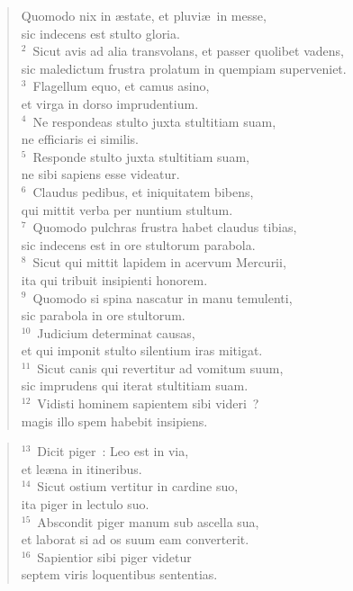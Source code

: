 \begin{flushleft}\begin{verse}\vspace{-19pt}\hspace{6pt}Quomodo nix in \ae state, et pluvi\ae\ in messe,\\\hspace{6pt} sic indecens est stulto gloria.\\
${}^{2}$~Sicut avis ad alia transvolans, et passer quolibet vadens,\\ sic maledictum frustra prolatum in quempiam superveniet.\\
${}^{3}$~Flagellum equo, et camus asino,\\ et virga in dorso imprudentium.\\
${}^{4}$~Ne respondeas stulto juxta stultitiam suam,\\ ne efficiaris ei similis.\\
${}^{5}$~Responde stulto juxta stultitiam suam,\\ ne sibi sapiens esse videatur.\\
${}^{6}$~Claudus pedibus, et iniquitatem bibens,\\ qui mittit verba per nuntium stultum.\\
${}^{7}$~Quomodo pulchras frustra habet claudus tibias,\\ sic indecens est in ore stultorum parabola.\\
${}^{8}$~Sicut qui mittit lapidem in acervum Mercurii,\\ ita qui tribuit insipienti honorem.\\
${}^{9}$~Quomodo si spina nascatur in manu temulenti,\\ sic parabola in ore stultorum.\\
${}^{10}$~Judicium determinat causas,\\ et qui imponit stulto silentium iras mitigat.\\
${}^{11}$~Sicut canis qui revertitur ad vomitum suum,\\ sic imprudens qui iterat stultitiam suam.\\
${}^{12}$~Vidisti hominem sapientem sibi videri~?\\ magis illo spem habebit insipiens.\end{verse}\end{flushleft}


\begin{flushleft}\begin{verse}${}^{13}$~Dicit piger~: Leo est in via,\\ et le\ae na in itineribus.\\
${}^{14}$~Sicut ostium vertitur in cardine suo,\\ ita piger in lectulo suo.\\
${}^{15}$~Abscondit piger manum sub ascella sua,\\ et laborat si ad os suum eam converterit.\\
${}^{16}$~Sapientior sibi piger videtur\\ septem viris loquentibus sententias.\end{verse}\end{flushleft}


